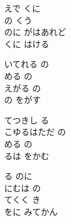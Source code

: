 \documentclass[10pt,b5j]{tarticle} %
\begin{document}
\vspace{1.5em} %
\newcommand{\linespace}{0.5em} %
\newcommand{\blocksize}{0.5\hsize} %
\begin{enumerate} %
    \begin{minipage}[c]{\blocksize}
    
        \vspace{\linespace}
        \item
        えで くに\\
        の くう\\
        のに がはあれど\\
        くに はける
        
        \vspace{\linespace}
        \item
        いてれる の\\
        める の\\
        えがる の\\
        の をがす
        
        \vspace{\linespace}
        \item
        てつきし る\\
        こゆるはただ の\\
        める の\\
        るは をかむ
        
        \vspace{\linespace}
        \item
        る のに\\
        にむは の\\
        てくく き\\
        をに みてかん
    
    \end{minipage}
\end{enumerate} %
\end{document}
